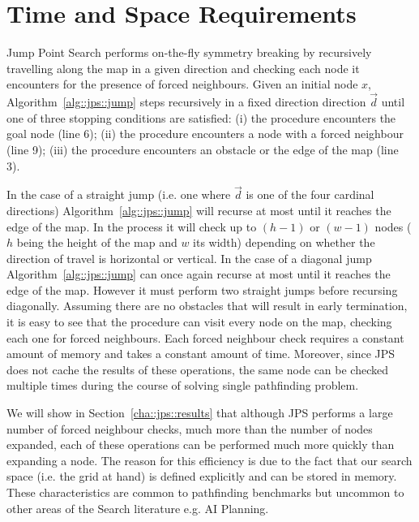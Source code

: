 \section{Time and Space Requirements}
Jump Point Search performs on-the-fly symmetry breaking by recursively travelling
along the map in a given direction and checking each node it encounters for the
presence of forced neighbours. 
Given an initial node $x$, Algorithm~\ref{alg::jps::jump} steps recursively in
a fixed direction direction $\vec{d}$ until one of three stopping conditions 
are satisfied: 
(i) the procedure encounters the goal node (line 6); 
(ii) the procedure encounters a node with a forced neighbour (line 9); 
(iii) the procedure encounters an obstacle or the edge of the map (line 3).  

In the case of a straight jump
(i.e. one where $\vec{d}$ is one of the four cardinal directions)
Algorithm~\ref{alg::jps::jump} will recurse at most until it reaches the edge of
the map. In the process it will check up to $(h-1)$ or $(w-1)$ nodes ($h$
being the height of the map and $w$ its width) 
depending on whether the direction of travel is horizontal or vertical.
In the case of a diagonal jump Algorithm~\ref{alg::jps::jump} can once again
recurse at most until it reaches the edge of the map. However it must perform two 
straight jumps before recursing diagonally. Assuming there are no obstacles that
will result in early termination, it is easy to see that the procedure can visit
every node on the map, checking each one for forced neighbours. 
Each forced neighbour check requires a constant amount of memory and takes a constant
amount of time. Moreover, since JPS does not cache the results of these operations, 
the same node can be checked multiple times during the course of solving single 
pathfinding problem. 

We will show in Section~\ref{cha::jps::results}
that although JPS performs a large number of forced neighbour checks, much more than
the number of nodes expanded, each of these operations can be performed much more 
quickly than expanding a node. The reason for this efficiency is due to the fact that
our search space (i.e. the grid at hand) is defined explicitly and can be stored
in memory. These characteristics are common to pathfinding benchmarks but uncommon 
to other areas of the Search literature e.g. AI Planning. 
